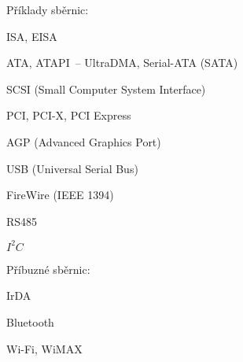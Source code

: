 Příklady sběrnic:
\begin{pitemize}
	\item ISA, EISA
	\item ATA, ATAPI~-- UltraDMA, Serial-ATA (SATA)
	\item SCSI (Small Computer System Interface)
	\item PCI, PCI-X, PCI Express
	\item AGP (Advanced Graphics Port)
	\item USB (Universal Serial Bus)
	\item FireWire (IEEE 1394)
	\item RS485
	\item $I^{2}C$
\end{pitemize}

Příbuzné sběrnic:
\begin{pitemize}
	\item IrDA
	\item Bluetooth
	\item Wi-Fi, WiMAX 
\end{pitemize}
